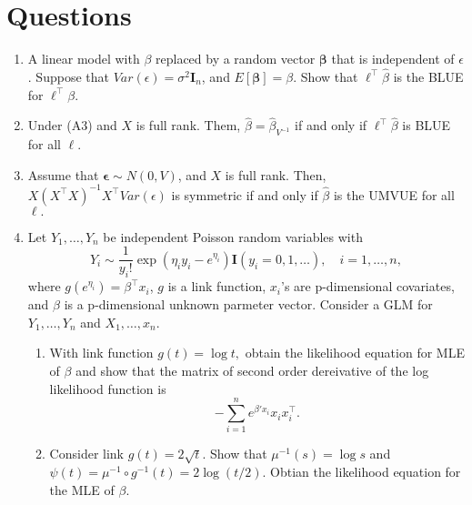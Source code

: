 \documentclass[12pt]{extarticle}
\begin{document}
\section{Questions}
\begin{enumerate}
\item A linear model with $\beta$ replaced by a random vector $\bm{\beta}$ that is independent of $\epsilon$. Suppose that $Var(\epsilon)=\sigma^2 \bm{I}_n$, and $E[\bm{\beta}]=\beta$. Show that $\ell^\top \hat{\beta}$ is the BLUE for $\ell^\top \beta$.
\vspace{3 cm}
\item Under (A3) and $X$ is full rank. Them, $\hat\beta=\hat \beta_{V^{-1}}$  if and only if $\ell^\top\hat\beta$ is BLUE for all $\ell.$

\vspace{3 cm}

\item Assume that $\bm{\epsilon}\sim N(0, V)$, and $X$ is full rank. Then,
	$X (X^\top X)^{-1}X^\top Var(\epsilon)$ is symmetric
	if and only if $\hat\beta$ is the UMVUE for all $\ell.$

\vspace{3 cm}
\item Let $Y_1,\dots,Y_n$ be independent Poisson random variables with 
$$Y_i\sim \frac{1}{y_i!}\exp(\eta_i y_i-e^{\eta_i})\bm{I}(y_i=0,1,\dots),\quad i=1,\dots,n,$$
where $g(e^{\eta_i})=\beta^\top x_i$, $g$ is a link function, $x_i$'s are p-dimensional covariates, and $\beta$ is a p-dimensional unknown parmeter vector. Consider a GLM for $Y_1,\dots,Y_n$ and $X_1,\dots,x_n.$
\begin{enumerate}
	\item With link function $g(t)=\log t,$ obtain the likelihood equation for MLE of $\beta$ and show that the matrix of second order dereivative of the log likelihood function is 
	$$-\sum_{i=1}^{n}e^{\beta'x_i}x_ix_i^\top.$$
	\item Consider link $g(t)=2\sqrt{t}.$ Show that $\mu^{-1}(s)=\log s$ and $\psi(t)=\mu^{-1}\circ g^{-1}(t)=2\log(t/2)$. Obtian the likelihood equation for the MLE of $\beta.$
\end{enumerate}



\end{enumerate}
\end{document}

